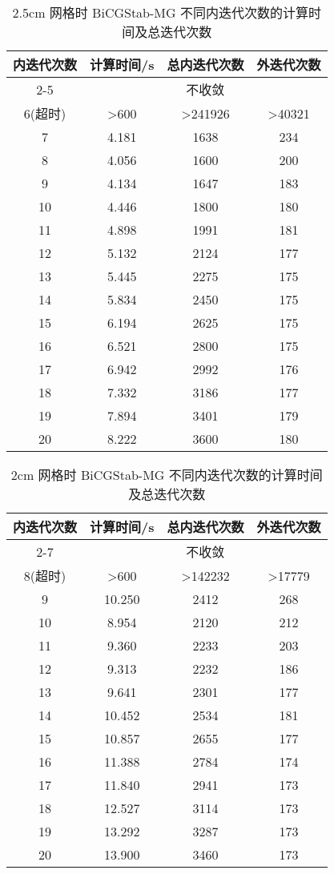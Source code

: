 \begin{datasheet}
\begin{table}
\centering
\caption{2.5cm 网格时 BiCGStab-MG 不同内迭代次数的计算时间及总迭代次数}
\label{tab:equsolve.iter.bicgstab-mg.2.5cm}
\begin{tabular}{cccc}
\toprule
内迭代次数 & 计算时间/s & 总内迭代次数 & 外迭代次数\\
\midrule
2-5 & \multicolumn{3}{c}{不收敛} \\ %
6(超时) & >600 & >241926 & >40321 \\ %
7 & 4.181 & 1638 & 234\\
8 & 4.056 & 1600 & 200\\
9 & 4.134 & 1647 & 183\\
10 & 4.446 & 1800 & 180\\
11 & 4.898 & 1991 & 181\\
12 & 5.132 & 2124 & 177\\
13 & 5.445 & 2275 & 175\\
14 & 5.834 & 2450 & 175\\
15 & 6.194 & 2625 & 175\\
16 & 6.521 & 2800 & 175\\
17 & 6.942 & 2992 & 176\\
18 & 7.332 & 3186 & 177\\
19 & 7.894 & 3401 & 179\\
20 & 8.222 & 3600 & 180\\
\bottomrule
\end{tabular}
\end{table}

\begin{table}
\centering
\caption{2cm 网格时 BiCGStab-MG 不同内迭代次数的计算时间及总迭代次数}
\label{tab:equsolve.iter.bicgstab-mg.2cm}
\begin{tabular}{cccc}
\toprule
内迭代次数 & 计算时间/s & 总内迭代次数 & 外迭代次数\\
\midrule
2-7 & \multicolumn{3}{c}{不收敛} \\ %
8(超时) & >600 & >142232 & >17779 \\ %
9 & 10.250 & 2412 & 268\\
10 & 8.954 & 2120 & 212\\
11 & 9.360 & 2233 & 203\\
12 & 9.313 & 2232 & 186\\
13 & 9.641 & 2301 & 177\\
14 & 10.452 & 2534 & 181\\
15 & 10.857 & 2655 & 177\\
16 & 11.388 & 2784 & 174\\
17 & 11.840 & 2941 & 173\\
18 & 12.527 & 3114 & 173\\
19 & 13.292 & 3287 & 173\\
20 & 13.900 & 3460 & 173\\
\bottomrule
\end{tabular}
\end{table}



\end{datasheet}
